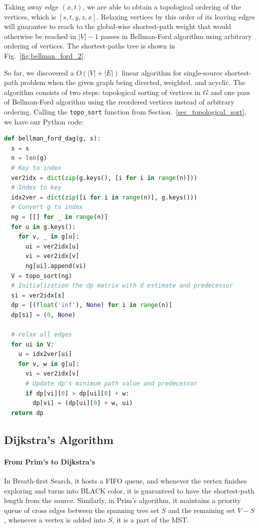 \documentclass[../main.tex]{subfiles}
\begin{document}
Taking away edge $(x, t)$, we are able to obtain a topological ordering of the vertices, which is $[s, t, y, z, x]$. Relaxing vertices by this order of its leaving edges will guarantee to reach to the global-wise shortest-path weight that would otherwise be reached in $|V|-1$ passes in Bellman-Ford algorithm using arbitrary ordering of vertices. The shortest-paths tree is shown in Fig.~\ref{fig:bellman_ford_2}.

So far, we discovered a $O(|V|+|E|)$ linear algorithm for single-source shortest-path problem when the given graph being directed, weighted, and acyclic. The algorithm consists of two steps: topological sorting of vertices in $G$ and one pass of Bellman-Ford algorithm using the reordered vertices instead of arbitrary ordering. Calling the \texttt{topo\_sort} function from Section.~\ref{sec_topological_sort}, we have our Python code:
\begin{lstlisting}[language=Python]
def bellman_ford_dag(g, s):
  s = s
  n = len(g)
  # Key to index
  ver2idx = dict(zip(g.keys(), [i for i in range(n)]))
  # Index to key
  idx2ver = dict(zip([i for i in range(n)], g.keys()))
  # Convert g to index
  ng = [[] for _ in range(n)]
  for u in g.keys():
    for v, _ in g[u]:
      ui = ver2idx[u]
      vi = ver2idx[v]
      ng[ui].append(vi)
  V = topo_sort(ng)
  # Initialization the dp matrix with d estimate and predecessor
  si = ver2idx[s]
  dp = [(float('inf'), None) for i in range(n)]
  dp[si] = (0, None)

  # relax all edges
  for ui in V:
    u = idx2ver[ui]
    for v, w in g[u]:
      vi = ver2idx[v]
      # Update dp's minimum path value and predecessor
      if dp[vi][0] > dp[ui][0] + w:
        dp[vi] = (dp[ui][0] + w, ui)
  return dp
\end{lstlisting}
\subsection{Dijkstra's Algorithm}
\label{subsec_dijkstra}
\paragraph{From Prim's to Dijkstra's} In Breath-first Search, it hosts a FIFO queue, and whenever the vertex finishes exploring and turns into BLACK color, it is guaranteed to have the shortest-path length from the source. Similarly, in Prim's algorithm, it maintains a priority queue of cross edges between the spanning tree set $S$ and the remaining set $V-S$, whenever a vertex is added into $S$, it is a part of the MST. 
\end{document}

